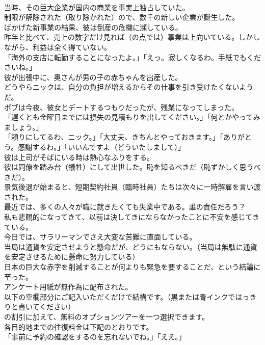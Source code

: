 \documentclass[8pt]{extreport}
\begin{document}
\begin{CJK}{UTF8}{min}
\\	当時、その巨大企業が国内の商業を事実上独占していた。
\\	制限が解除された（取り除かれた）ので、数千の新しい企業が誕生した。
\\	ばかげた新事業の結果、彼は倒産の危機に瀕している。
\\	昨年と比べて、売上の数字だけ見れば（の点では）事業は上向いている。しかしながら、利益は全く得ていない。
\\	「海外の支店に転勤することになったよ。」「えっ。寂しくなるわ。手紙でもくださいね。」
\\	彼が出張中に、奥さんが男の子の赤ちゃんを出産した。
\\	どうやらニックは、自分の負担が増えるからその仕事を引き受けたくないようだ。
\\	ボブは今夜、彼女とデートするつもりだったが、残業になってしまった。
\\	「遅くとも金曜日までには損失の見積もりを出してください。」「何とかやってみましょう。」
\\	「頼りにしてるわ、ニック。」「大丈夫、きちんとやっておきます。」「ありがとう。感謝するわ。」「いいんですよ（どういたしまして）」
\\	彼は上司がそばにいる時は熱心なふりをする。
\\	彼は同僚を踏み台（犠牲）にして出世した。恥を知るべきだ（恥ずかしく思うべきだ）。
\\	景気後退が始まると、短期契約社員（臨時社員）たちは次々に一時解雇を言い渡された。
\\	最近では、多くの人々が職に就きたくても失業中である。誰の責任だろう？
\\	私も悲観的になってきて、以前は決してきにならなかったことに不安を感じてきている。
\\	今日では、サラリーマンでさえ大変な苦難に直面している。
\\	当局は通貨を安定させようと懸命だが、どうにもならない。（当局は無駄に通貨を安定させるために懸命に努力している）
\\	日本の巨大な赤字を削減することが何よりも緊急を要することだ、という結論に至った。
\\	アンケート用紙が無作為に配布された。
\\	以下の空欄部分にご記入いただくだけで結構です。（黒または青インクではっきりと書いてください）
\\	の割引に加えて、無料のオプションツアーを一つ選択できます。
\\	各目的地までの往復料金は下記のとおりです。
\\	「事前に予約の確認をするのを忘れないでね。」「ええ。」

\end{CJK}
\end{document}
